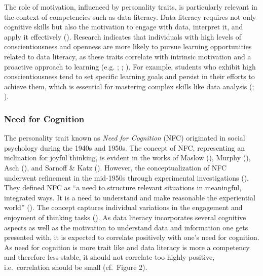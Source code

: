 \documentclass[
  12pt,
  a4paper,
  twoside]{article}
\begin{document}
The role of motivation, influenced by personality traits, is particularly relevant in the context of competencies such as data literacy. Data literacy requires not only cognitive skills but also the motivation to engage with data, interpret it, and apply it effectively (). Research indicates that individuals with high levels of conscientiousness and openness are more likely to pursue learning opportunities related to data literacy, as these traits correlate with intrinsic motivation and a proactive approach to learning (e.g. ; ; ). For example, students who exhibit high conscientiousness tend to set specific learning goals and persist in their efforts to achieve them, which is essential for mastering complex skills like data analysis (; ).

\subsubsection{Need for Cognition}\label{need-for-cognition}

The personality trait known as \emph{Need for Cognition} (NFC) originated in social psychology during the 1940s and 1950s. The concept of NFC, representing an inclination for joyful thinking, is evident in the works of Maslow (), Murphy (), Asch (), and Sarnoff \& Katz (). However, the conceptualization of NFC underwent refinement in the mid-1950s through experimental investigations (). They defined NFC as ``a need to structure relevant situations in meaningful, integrated ways. It is a need to understand and make reasonable the experiential world'' (). The concept captures individual variations in the engagement and enjoyment of thinking tasks (). As data literacy incorporates several cognitive aspects as well as the motivation to understand data and information one gets presented with, it is expected to correlate positively with one's need for cognition. As need for cognition is more trait like and data literacy is more a competency and therefore less stable, it should not correlate too highly positive, i.e.~correlation should be small (cf.~Figure 2).
\end{document}
